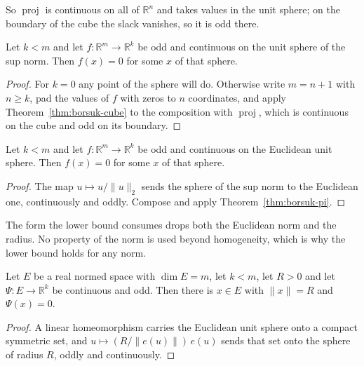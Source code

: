 So $\operatorname{proj}$ is continuous on all of $\mathbb{R}^n$ and takes values in the
unit sphere; on the boundary of the cube the slack vanishes, so it is odd there.

\begin{theorem}
\label{thm:borsuk-pi}
\leanok
{}
Let $k < m$ and let $f : \mathbb{R}^m \to \mathbb{R}^k$ be odd and continuous on the
unit sphere of the sup norm. Then $f(x) = 0$ for some $x$ of that sphere.
\end{theorem}
\begin{proof}
\leanok
{}
For $k = 0$ any point of the sphere will do. Otherwise write $m = n + 1$ with
$n \ge k$, pad the values of $f$ with zeros to $n$ coordinates, and apply
Theorem~\ref{thm:borsuk-cube} to the composition with $\operatorname{proj}$, which is
continuous on the cube and odd on its boundary.
\end{proof}

\begin{theorem}
\label{thm:borsuk-ulam}
\leanok
Let $k < m$ and let $f : \mathbb{R}^m \to \mathbb{R}^k$ be odd and continuous on the
Euclidean unit sphere. Then $f(x) = 0$ for some $x$ of that sphere.
\end{theorem}
\begin{proof}
\leanok
{}
The map $u \mapsto u / \|u\|_2$ sends the sphere of the sup norm to the Euclidean one,
continuously and oddly. Compose and apply Theorem~\ref{thm:borsuk-pi}.
\end{proof}

The form the lower bound consumes drops both the Euclidean norm and the radius. No
property of the norm is used beyond homogeneity, which is why the lower bound holds for
any norm.

\begin{corollary}
\label{cor:borsuk-ulam-norm}
\leanok
Let $E$ be a real normed space with $\dim E = m$, let $k < m$, let $R > 0$ and let
$\Psi : E \to \mathbb{R}^k$ be continuous and odd. Then there is $x \in E$ with
$\|x\| = R$ and $\Psi(x) = 0$.
\end{corollary}
\begin{proof}
\leanok
{}
A linear homeomorphism carries the Euclidean unit sphere onto a compact symmetric set,
and $u \mapsto (R / \|e(u)\|) \, e(u)$ sends that set onto the sphere of radius $R$,
oddly and continuously.
\end{proof}

